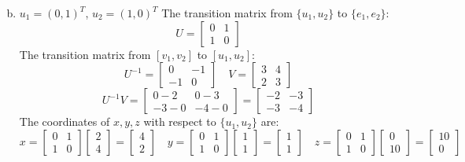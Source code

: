 \documentclass{article}
\begin{document}
\begin{enumerate}[(a)]
$$    $$
    \item
    $u_1 = (0,1)^T$, $u_2 = (1,0)^T$
    The transition matrix from $\{u_1, u_2\}$ to $\{e_1, e_2\}$:
    $$ U = \begin{bmatrix} 0 & 1 \\ 1 & 0 \end{bmatrix} $$
    The transition matrix from $[v_1, v_2]$ to $[u_1, u_2]$:
    $$ U^{-1} = \begin{bmatrix} 0 & -1 \\ -1 & 0 \end{bmatrix} \quad
    V = \begin{bmatrix} 3 & 4 \\ 2 & 3 \end{bmatrix} $$
    $$ U^{-1}V = \begin{bmatrix} 0-2 & 0-3 \\ -3-0 & -4-0 \end{bmatrix} =
    \begin{bmatrix} -2 & -3 \\ -3 & -4 \end{bmatrix} $$
    The coordinates of $x, y, z$ with respect to $\{u_1, u_2\}$ are:
    $$
    x = \begin{bmatrix} 0 & 1 \\ 1 & 0 \end{bmatrix} \begin{bmatrix} 2 \\ 4 \end{bmatrix}
     = \begin{bmatrix} 4 \\ 2 \end{bmatrix}
    \quad
    y = \begin{bmatrix} 0 & 1 \\ 1 & 0 \end{bmatrix} \begin{bmatrix} 1 \\ 1 \end{bmatrix}
     = \begin{bmatrix} 1 \\ 1 \end{bmatrix}
    \quad
    z = \begin{bmatrix} 0 & 1 \\ 1 & 0 \end{bmatrix} \begin{bmatrix} 0 \\ 10 \end{bmatrix}
     = \begin{bmatrix} 10 \\ 0 \end{bmatrix}
    $$
\end{enumerate}
\end{document}
